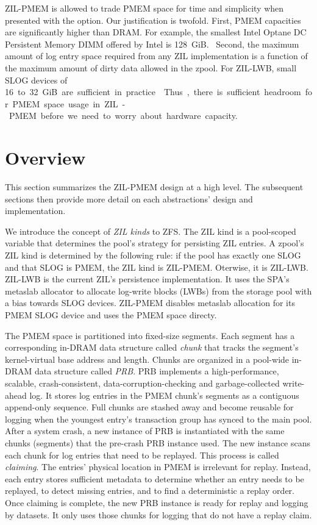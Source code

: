 \documentclass[12pt,a4paper,twoside]{book}
\begin{document}
ZIL-PMEM is allowed to trade PMEM space for time and simplicity when presented with the option.
Our justification is twofold.
First, PMEM capacities are significantly higher than DRAM.
For example, the smallest Intel Optane DC Persistent Memory DIMM offered by Intel is \SI{128}{GiB}.~\cite{optanepricing_missing}
Second, the maximum amount of log entry space required from any ZIL implementation is a function of the maximum amount of dirty data allowed in the zpool.
For ZIL-LWB, small SLOG devices of \SI{16} to \SI{32}{GiB} are sufficient in practice.
Thus, there is sufficient headroom for PMEM space usage in ZIL-PMEM before we need to worry about hardware capacity.


\section{Overview}
This section summarizes the ZIL-PMEM design at a high level.
The subsequent sections then provide more detail on each abstractions' design and implementation.

We introduce the concept of \textit{ZIL kinds} to ZFS.
The ZIL kind is a pool-scoped variable that determines the pool's strategy for persisting ZIL entries.
A zpool's ZIL kind is determined by the following rule:
if the pool has exactly one SLOG and that SLOG is PMEM, the ZIL kind is ZIL-PMEM. Oterwise, it is ZIL-LWB.
ZIL-LWB is the current ZIL's persistence implementation.
It uses the SPA's metaslab allocator to allocate log-write blocks (LWBs) from the storage pool with a bias towards SLOG devices.
ZIL-PMEM disables metaslab allocation for its PMEM SLOG device and uses the PMEM space directy.

The PMEM space is partitioned into fixed-size segments.
Each segment has a corresponding in-DRAM data structure called \textit{chunk} that tracks the segment's kernel-virtual base address and length.
Chunks are organized in a pool-wide in-DRAM data structure called \textit{PRB}.
PRB implements a high-performance, scalable, crash-consistent, data-corruption-checking and garbage-collected write-ahead log.
It stores log entries in the PMEM chunk's segments as a contiguous append-only sequence.
Full chunks are stashed away and become reusable for logging when the youngest entry's transaction group has synced to the main pool.
After a system crash, a new instance of PRB is instantiated with the same chunks (segments) that the pre-crash PRB instance used.
The new instance scans each chunk for log entries that need to be replayed.
This process is called \textit{claiming}.
The entries' physical location in PMEM is irrelevant for replay.
Instead, each entry stores sufficient metadata to determine whether an entry needs to be replayed, to detect missing entries, and to find a deterministic a replay order.
Once claiming is complete, the new PRB instance is ready for replay and logging by datasets.
It only uses those chunks for logging that do not have a replay claim.
\end{document}
